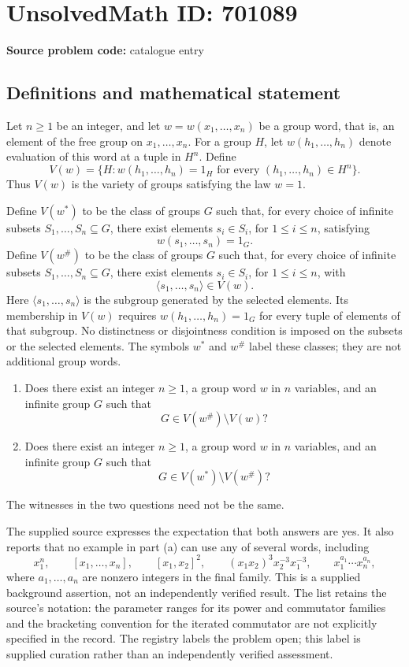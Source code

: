 \documentclass[11pt]{article}
\begin{document}
\section*{UnsolvedMath ID: 701089}
\textbf{Source problem code:} catalogue entry
\subsection{Definitions and mathematical statement}
Let \(n\geq 1\) be an integer, and let \(w=w(x_1,\ldots,x_n)\) be a group word, that is, an element of the free group on \(x_1,\ldots,x_n\). For a group \(H\), let \(w(h_1,\ldots,h_n)\) denote evaluation of this word at a tuple in \(H^n\). Define
\[
V(w)=\{H: w(h_1,\ldots,h_n)=1_H\text{ for every }(h_1,\ldots,h_n)\in H^n\}.
\]
Thus \(V(w)\) is the variety of groups satisfying the law \(w=1\).

Define \(V(w^*)\) to be the class of groups \(G\) such that, for every choice of infinite subsets \(S_1,\ldots,S_n\subseteq G\), there exist elements \(s_i\in S_i\), for \(1\leq i\leq n\), satisfying
\[
w(s_1,\ldots,s_n)=1_G.
\]
Define \(V(w^{\#})\) to be the class of groups \(G\) such that, for every choice of infinite subsets \(S_1,\ldots,S_n\subseteq G\), there exist elements \(s_i\in S_i\), for \(1\leq i\leq n\), with
\[
\langle s_1,\ldots,s_n\rangle\in V(w).
\]
Here \(\langle s_1,\ldots,s_n\rangle\) is the subgroup generated by the selected elements. Its membership in \(V(w)\) requires \(w(h_1,\ldots,h_n)=1_G\) for every tuple of elements of that subgroup. No distinctness or disjointness condition is imposed on the subsets or the selected elements. The symbols \(w^*\) and \(w^{\#}\) label these classes; they are not additional group words.

\begin{enumerate}
\item[(a)] Does there exist an integer \(n\geq 1\), a group word \(w\) in \(n\) variables, and an infinite group \(G\) such that
\[
G\in V(w^{\#})\setminus V(w)?
\]
\item[(b)] Does there exist an integer \(n\geq 1\), a group word \(w\) in \(n\) variables, and an infinite group \(G\) such that
\[
G\in V(w^*)\setminus V(w^{\#})?
\]
\end{enumerate}
The witnesses in the two questions need not be the same.

The supplied source expresses the expectation that both answers are yes. It also reports that no example in part (a) can use any of several words, including
\[
x_1^n,\qquad [x_1,\ldots,x_n],\qquad [x_1,x_2]^2,
\qquad (x_1x_2)^3x_2^{-3}x_1^{-3},
\qquad x_1^{a_1}\cdots x_n^{a_n},
\]
where \(a_1,\ldots,a_n\) are nonzero integers in the final family. This is a supplied background assertion, not an independently verified result. The list retains the source's notation: the parameter ranges for its power and commutator families and the bracketing convention for the iterated commutator are not explicitly specified in the record. The registry labels the problem open; this label is supplied curation rather than an independently verified assessment.
\end{document}
